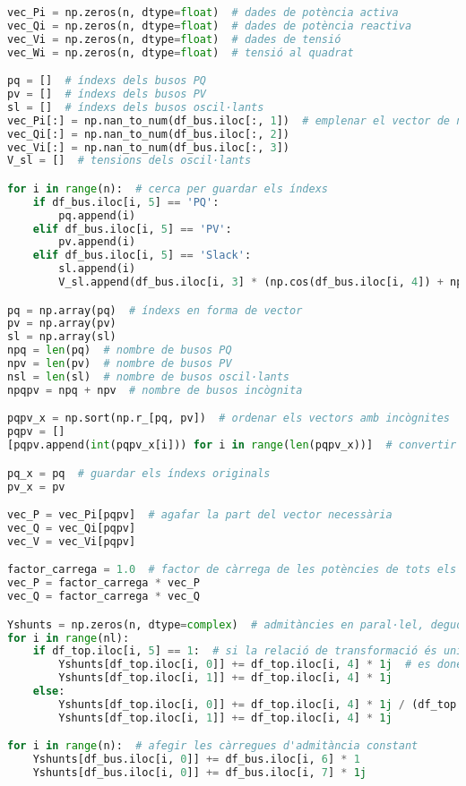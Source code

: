 \begin{lstlisting}[language=Python,numbers=none]
vec_Pi = np.zeros(n, dtype=float)  # dades de potència activa
vec_Qi = np.zeros(n, dtype=float)  # dades de potència reactiva
vec_Vi = np.zeros(n, dtype=float)  # dades de tensió
vec_Wi = np.zeros(n, dtype=float)  # tensió al quadrat

pq = []  # índexs dels busos PQ
pv = []  # índexs dels busos PV
sl = []  # índexs dels busos oscil·lants
vec_Pi[:] = np.nan_to_num(df_bus.iloc[:, 1])  # emplenar el vector de números
vec_Qi[:] = np.nan_to_num(df_bus.iloc[:, 2])
vec_Vi[:] = np.nan_to_num(df_bus.iloc[:, 3])
V_sl = []  # tensions dels oscil·lants

for i in range(n):  # cerca per guardar els índexs
    if df_bus.iloc[i, 5] == 'PQ':
        pq.append(i)
    elif df_bus.iloc[i, 5] == 'PV':
        pv.append(i)
    elif df_bus.iloc[i, 5] == 'Slack':
        sl.append(i)
        V_sl.append(df_bus.iloc[i, 3] * (np.cos(df_bus.iloc[i, 4]) + np.sin(df_bus.iloc[i, 4]) * 1j))

pq = np.array(pq)  # índexs en forma de vector
pv = np.array(pv)
sl = np.array(sl)
npq = len(pq)  # nombre de busos PQ
npv = len(pv)  # nombre de busos PV
nsl = len(sl)  # nombre de busos oscil·lants
npqpv = npq + npv  # nombre de busos incògnita

pqpv_x = np.sort(np.r_[pq, pv])  # ordenar els vectors amb incògnites
pqpv = []
[pqpv.append(int(pqpv_x[i])) for i in range(len(pqpv_x))]  # convertir els índexs a enters

pq_x = pq  # guardar els índexs originals
pv_x = pv

vec_P = vec_Pi[pqpv]  # agafar la part del vector necessària
vec_Q = vec_Qi[pqpv]
vec_V = vec_Vi[pqpv]

factor_carrega = 1.0  # factor de càrrega de les potències de tots els busos
vec_P = factor_carrega * vec_P
vec_Q = factor_carrega * vec_Q

Yshunts = np.zeros(n, dtype=complex)  # admitàncies en paral·lel, degudes a les capacitats
for i in range(nl):
    if df_top.iloc[i, 5] == 1:  # si la relació de transformació és unitària
        Yshunts[df_top.iloc[i, 0]] += df_top.iloc[i, 4] * 1j  # es donen en forma d'admitàncies
        Yshunts[df_top.iloc[i, 1]] += df_top.iloc[i, 4] * 1j
    else:
        Yshunts[df_top.iloc[i, 0]] += df_top.iloc[i, 4] * 1j / (df_top.iloc[i, 5] ** 2)
        Yshunts[df_top.iloc[i, 1]] += df_top.iloc[i, 4] * 1j

for i in range(n):  # afegir les càrregues d'admitància constant
    Yshunts[df_bus.iloc[i, 0]] += df_bus.iloc[i, 6] * 1
    Yshunts[df_bus.iloc[i, 0]] += df_bus.iloc[i, 7] * 1j


\end{lstlisting}
